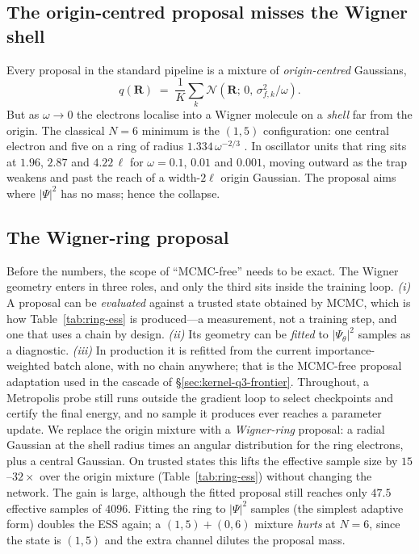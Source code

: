\subsection{The origin-centred proposal misses the Wigner shell}
Every proposal in the standard pipeline is a mixture of \emph{origin-centred} Gaussians,
\begin{equation}
  q(\mathbf{R})\;=\;\frac{1}{K}\sum_k \mathcal{N}\!\left(\mathbf{R};\,0,\,
  \sigma_{f,k}^{2}/\omega\right).
\end{equation}
But as $\omega\to0$ the electrons localise into a Wigner molecule on a \emph{shell} far
from the origin. The classical $N=6$ minimum is the $(1,5)$ configuration: one central electron
and five on a ring of radius $1.334\,\omega^{-2/3}$
\cite{schweigert1994spectralpropertieschargedparticles,Kong_2002}. In oscillator units
that ring sits at $1.96$, $2.87$ and $4.22\,\ell$ for $\omega=0.1$, $0.01$ and $0.001$,
moving outward as the trap weakens and past the reach of a width-$2\ell$ origin
Gaussian. The proposal aims where $|\Psi|^2$ has
no mass; hence the collapse.

\subsection{The Wigner-ring proposal}

Before the numbers, the scope of ``MCMC-free'' needs to be exact. The Wigner geometry enters
in three roles, and only the third sits inside the
training loop. \emph{(i)} A proposal can be \emph{evaluated} against a trusted state
obtained by MCMC, which is how Table~\ref{tab:ring-ess} is produced---a measurement, not a
training step, and one that uses a chain by design. \emph{(ii)} Its geometry can be
\emph{fitted} to $|\Psi_\theta|^2$ samples as a diagnostic. \emph{(iii)} In production it is
refitted from the current importance-weighted batch alone, with no chain anywhere; that is
the MCMC-free proposal adaptation used in the cascade of
\S\ref{sec:kernel-q3-frontier}. Throughout, a Metropolis probe still runs outside the
gradient loop to select checkpoints and certify the final energy, and no sample it produces
ever reaches a parameter update.
We replace the origin mixture with a \emph{Wigner-ring} proposal: a radial Gaussian at the
shell radius times an angular distribution for the ring electrons, plus a central Gaussian.
On trusted states this lifts the effective sample size by $15$--$32\times$ over the origin
mixture (Table~\ref{tab:ring-ess}) without changing the network. The gain is large, although
the fitted proposal still reaches only $47.5$ effective samples of $4096$. Fitting the ring to $|\Psi|^2$ samples (the simplest
adaptive form) doubles the ESS again; a $(1,5)+(0,6)$ mixture \emph{hurts} at $N=6$, since
the state is $(1,5)$ and the extra channel dilutes the proposal mass.

